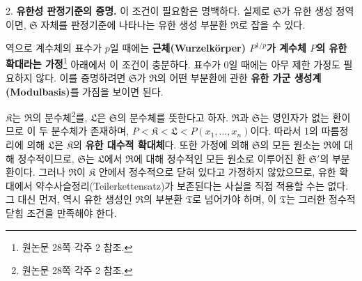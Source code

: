 \documentclass[11pt]{article}
\begin{document}
2. \textbf{유한성 판정기준의 증명.} 이 조건이 필요함은 명백하다. 실제로 $\mathfrak S$가 유한 생성 정역이면, $\mathfrak S$ 자체를 판정기준에 나타나는 유한 생성 부분환 $\mathfrak R$로 잡을 수 있다.

역으로 계수체의 표수가 $p$일 때에는 \textbf{근체(Wurzelkörper) $P^{1/p}$가 계수체 $P$의 유한 확대라는 가정}\footnote{원논문 28쪽 각주 2 참조.} 아래에서 이 조건이 충분하다. 표수가 0일 때에는 아무 제한 가정도 필요하지 않다. 이를 증명하려면 $\mathfrak S$가 $\mathfrak R$의 어떤 부분환에 관한 \textbf{유한 가군 생성계(Modulbasis)}를 가짐을 보이면 된다.

$\mathfrak K$는 $\mathfrak R$의 분수체\footnote{원논문 28쪽 각주 2 참조.}를, $\mathfrak L$은 $\mathfrak S$의 분수체를 뜻한다고 하자. $\mathfrak R$과 $\mathfrak S$는 영인자가 없는 환이므로 이 두 분수체가 존재하며, $P<\mathfrak K<\mathfrak L<P(x_1,\ldots,x_n)$이다. 따라서 1의 따름정리에 의해 $\mathfrak L$은 $\mathfrak K$의 \textbf{유한 대수적 확대체}다. 또한 가정에 의해 $\mathfrak S$의 모든 원소는 $\mathfrak R$에 대해 정수적이므로, $\mathfrak S$는 $\mathfrak L$에서 $\mathfrak R$에 대해 정수적인 모든 원소로 이루어진 환 $\mathfrak S'$의 부분환이다. 그러나 $\mathfrak R$이 $\mathfrak K$ 안에서 정수적으로 닫혀 있다고 가정하지 않았으므로, 유한 확대에서 약수사슬정리(Teilerkettensatz)가 보존된다는 사실을 직접 적용할 수는 없다. 그 대신 먼저, 역시 유한 생성인 $\mathfrak R$의 부분환 $\mathfrak T$로 넘어가야 하며, 이 $\mathfrak T$는 그러한 정수적 닫힘 조건을 만족해야 한다.
\end{document}
